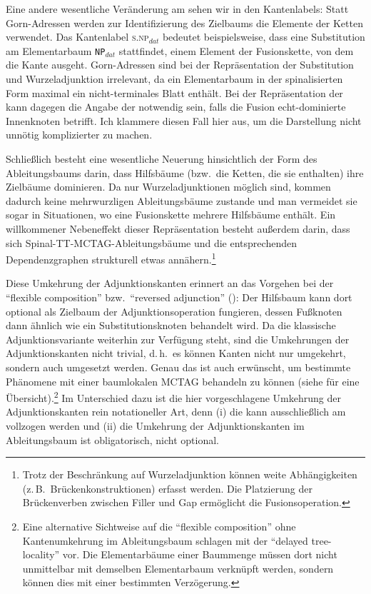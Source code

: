 Eine andere wesentliche Veränderung am  sehen wir in den Kantenlabels: Statt Gorn-Adressen werden zur Identifizierung des Zielbaums die Elemente der Ketten verwendet. Das Kantenlabel \textsc{s.np$_{\mathit{dat}}$} bedeutet beispielsweise, dass eine Substitution am Elementarbaum {\tt NP$_{\mathit{dat}}$} stattfindet, einem Element der Fusionskette, von dem die Kante ausgeht. Gorn-Adressen sind bei der Repräsentation der Substitution und Wurzeladjunktion irrelevant, da ein Elementarbaum in der spinalisierten Form maximal ein nicht-terminales Blatt enthält. Bei der Repräsentation der  kann dagegen die Angabe der  notwendig sein, falls die Fusion echt-dominierte Innenknoten betrifft. Ich klammere diesen Fall hier aus, um die Darstellung nicht unnötig komplizierter zu machen.

Schlie\ss lich besteht eine wesentliche Neuerung hinsichtlich der Form des Ableitungsbaums darin, dass Hilfsbäume (bzw.\ die Ketten, die sie enthalten) ihre Zielbäume dominieren. Da nur Wurzeladjunktionen möglich sind, kommen dadurch keine mehrwurzligen Ableitungsbäume zustande und man vermeidet sie sogar in Situationen, wo eine Fusionskette mehrere Hilfsbäume enthält. Ein willkommener Nebeneffekt dieser Repräsentation besteht au\ss erdem darin, dass sich Spinal-TT-MCTAG-Ableitungsbäume und die entsprechenden Dependenzgraphen strukturell etwas annähern.\footnote{Trotz der Beschränkung auf Wurzeladjunktion können weite Abhängigkeiten (z.\,B.\ Brückenkonstruktionen) erfasst werden. Die Platzierung der Brückenverben zwischen Filler und Gap ermöglicht die Fusionsoperation.}

Diese Umkehrung der Adjunktionskanten erinnert an das Vorgehen bei der "`flexible composition"' bzw.\ "`reversed adjunction"' (\citealt{Joshi:etal:03, Kallmeyer:Joshi:03, Chiang:Scheffler:08}): Der Hilfsbaum kann dort optional als Zielbaum der Adjunktionsoperation fungieren, dessen Fu\ss knoten dann ähnlich wie ein Substitutionsknoten behandelt wird. Da die klassische Adjunktionsvariante weiterhin zur Verfügung steht, sind die Umkehrungen der Adjunktionskanten nicht trivial, d.\,h.\ es können Kanten nicht nur umgekehrt, sondern auch umgesetzt werden. Genau das ist auch erwünscht, um bestimmte Phänomene mit einer baumlokalen MCTAG behandeln zu können (siehe \cite{Chiang:Scheffler:08} für eine Übersicht).\footnote{Eine alternative Sichtweise auf die "`flexible composition"' ohne Kantenumkehrung im Ableitungsbaum schlagen \cite{Chiang:Scheffler:08} mit der "`delayed tree-locality"' vor. Die Elementarbäume einer Baummenge müssen dort nicht unmittelbar mit demselben Elementarbaum verknüpft werden, sondern können dies mit einer bestimmten Verzögerung.} Im Unterschied dazu ist die hier vorgeschlagene Umkehrung der Adjunktionskanten rein notationeller Art, denn (i) die  kann ausschlie\ss lich am  vollzogen werden und (ii) die Umkehrung der Adjunktionskanten im Ableitungsbaum ist obligatorisch, nicht optional.

